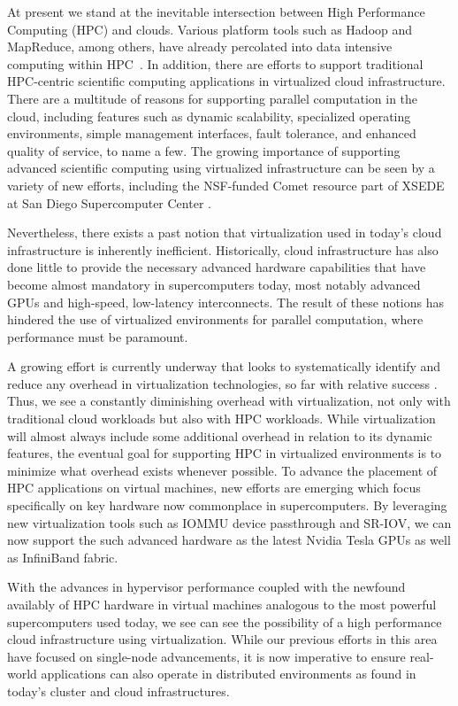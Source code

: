 \documentclass{sigplanconf}
\begin{document}
At present we stand at the inevitable intersection between High Performance Computing (HPC) and clouds. Various platform tools such as Hadoop and MapReduce, among others, have already percolated into data intensive computing within HPC~\cite{jha2014apache}.  In addition, there are efforts to support traditional HPC-centric scientific computing applications in virtualized cloud infrastructure.  There are a multitude of reasons for supporting parallel computation in the cloud\cite{Armbrust2010}, including features such as dynamic scalability, specialized operating environments, simple management interfaces, fault tolerance, and enhanced quality of service, to name a few. The growing importance of supporting advanced scientific computing using virtualized infrastructure can be seen by a variety of new efforts, including the NSF-funded Comet resource part of XSEDE at San Diego Supercomputer Center \cite{moore2014gateways}.  

Nevertheless, there exists a past notion that virtualization used in today's cloud infrastructure is inherently inefficient.  Historically, cloud infrastructure has also done little to provide the necessary advanced hardware capabilities that have become almost mandatory in supercomputers today, most notably advanced GPUs and high-speed, low-latency interconnects.  The result of these notions has hindered the use of virtualized environments for parallel computation, where performance must be paramount.

A growing effort is currently underway that looks to systematically identify and reduce any overhead in virtualization technologies, so far with relative success \cite{Younge2011cloud, Luszczek:2011:EHC}.  Thus, we see a constantly diminishing overhead with virtualization, not only with traditional cloud workloads \cite{huber2011evaluating} but also with HPC workloads.  While virtualization will almost always include some additional overhead in relation to its dynamic features, the eventual goal for supporting HPC in virtualized environments is to minimize what overhead exists whenever possible.  To advance the placement of HPC applications on virtual machines, new efforts are emerging which focus specifically on key hardware now commonplace in supercomputers. By leveraging new virtualization tools such as IOMMU device passthrough and SR-IOV, we can now support the such advanced hardware as the latest Nvidia Tesla GPUs \cite{Walters2014cloud}  as well as InfiniBand fabric\cite{jose2013sr}.  

With the advances in hypervisor performance coupled with the newfound availably of HPC hardware in virtual machines analogous to the most powerful supercomputers used today, we see can see the possibility of a high performance cloud infrastructure using virtualization. While our previous efforts in this area have focused on single-node advancements, it is now imperative to ensure real-world applications can also operate in distributed environments as found in today's cluster and cloud infrastructures. 
\end{document}
